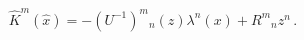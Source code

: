\begin{equation}
\hat{K}^{m} (\hat{x}) = -(U^{-1})^{m}{}_{n}(z) \lambda^{n}(x) +R^{m}{}_{n}z^{n} \,. 
\end{equation}

